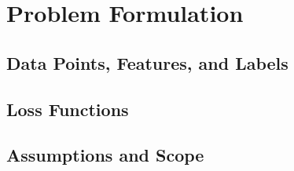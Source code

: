 \documentclass[11pt,a4paper,oneside]{report}
\newcommand{\featurevec}{\mathbf{x}}      %
\newcommand{\labelscalar}{y}              %
\newcommand{\dataset}{\mathcal{D}}        %
\newcommand{\hypothesis}{h}               %
\newcommand{\loss}{\ell}                  %
\newcommand{\reals}{\mathbb{R}}
\begin{document}
\chapter{Problem Formulation}
\label{ch:problem}


\section{Data Points, Features, and Labels}
%

\section{Loss Functions}
%
%

\section{Assumptions and Scope}

\end{document}
